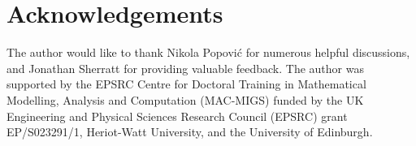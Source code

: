 \documentclass{article}
\theoremstyle{definition}
\numberwithin{equation}{section}
\begin{document}
\section*{Acknowledgements}
The author would like to thank Nikola Popovi\'c for numerous helpful discussions, and
Jonathan Sherratt for providing valuable feedback. The author was supported by the EPSRC Centre for Doctoral Training in Mathematical Modelling, Analysis and Computation (MAC-MIGS) funded by the UK Engineering and Physical Sciences Research Council (EPSRC) grant EP/S023291/1, Heriot-Watt University, and the University of Edinburgh.





\nocite{*}
\printbibliography
\end{document}
